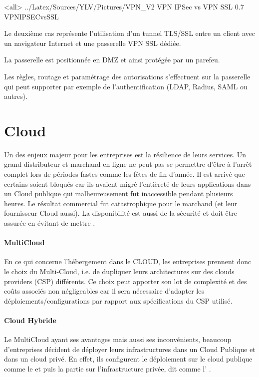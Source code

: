 \mode<all>{\picframe
{../Latex/Sources/YLV/Pictures/VPN_V2}%
{VPN IPSec vs VPN SSL} %
{0.7} %
{VPNIPSECvsSSL} %
}

Le deuxième cas représente l'utilisation d'un tunnel TLS/SSL entre un client avec un navigateur Internet et une passerelle VPN SSL dédiée. 

La passerelle est positionnée en DMZ et ainsi protégée par un parefeu.

Les règles, routage et paramétrage des autorisations s'effectuent sur la passerelle qui peut supporter par exemple de l'authentification (LDAP, Radius, SAML ou autres).




\section{Cloud}


Un des enjeux majeur pour les entreprises est la résilience de leurs services. Un grand distributeur et marchand en ligne ne peut pas se permettre d'être à l'arrêt complet lors de périodes fastes comme les fêtes de fin d'année. Il est arrivé que certains soient bloqués car ils avaient migré l'entièreté de leurs applications dans un Cloud publique qui malheureusement fut inaccessible pendant plusieurs heures. Le résultat commercial fut catastrophique pour le marchand (et leur fournisseur Cloud aussi). 
La disponibilité est aussi de la sécurité et doit être assurée en évitant de mettre .
\paragraph{MultiCloud}
En ce qui concerne l'hébergement dans le CLOUD, les entreprises prennent donc le choix du Multi-Cloud, i.e. de dupliquer leurs architectures sur des clouds providers (CSP) différents. Ce choix peut apporter son lot de complexité et des coûts associés non négligeables car il sera nécessaire d'adapter les déploiements/configurations par rapport aux spécifications du CSP utilisé.
\paragraph{Cloud Hybride}
Le MultiCloud ayant ses avantages mais aussi ses inconvénients, beaucoup d'entreprises décident de déployer leurs infrastructures dans un Cloud Publique et dans un cloud privé. En effet, ils configurent le déploiement sur le cloud publique comme le  et puis la partie sur l'infrastructure privée, dit  comme l' .

